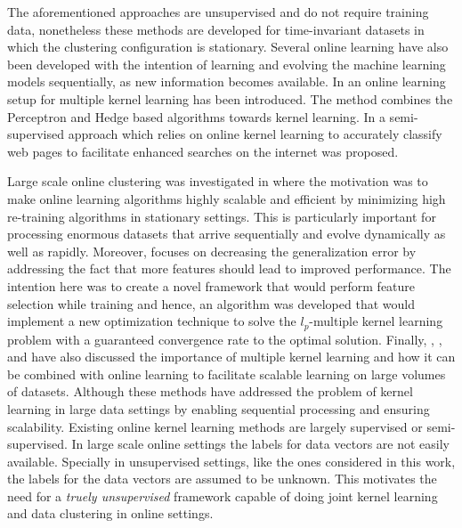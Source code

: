 \documentclass[10pt,final]{IEEEtran}
\begin{document}
The aforementioned approaches are unsupervised and do not require training data, nonetheless these methods are developed for time-invariant datasets in which the clustering configuration is stationary. 
Several online learning have also been developed
with the intention of learning and evolving the machine learning models  sequentially, as new information becomes available. In \cite{Online MKL,Online Multiple Kernel Learning} an online learning setup for multiple kernel learning has been introduced. The method combines the Perceptron and Hedge based algorithms  towards kernel learning. In \cite{Semi-supervised} a semi-supervised approach which relies on online kernel learning to accurately classify web pages to facilitate enhanced searches on the internet was proposed.

Large scale online clustering was investigated in \cite{LSOKL} where the motivation was to make online learning algorithms highly scalable and efficient by minimizing high re-training algorithms in stationary settings. This is particularly important for processing enormous datasets that arrive sequentially and evolve dynamically as well as rapidly. Moreover, \cite{MKL} focuses on decreasing the generalization error by addressing the fact that more features should lead to improved performance. The intention here was to create a novel framework that would perform feature selection while training and hence, an algorithm was developed that would implement a new optimization technique to solve the $l_p$-multiple kernel learning problem with a guaranteed convergence rate to the optimal solution. Finally, \cite{OEML}, \cite{OMKLGSF}, and \cite{Random OMKL} have also discussed the importance of multiple kernel learning and how it can be combined with online learning to facilitate scalable learning on large volumes of datasets. 
Although these methods have addressed the problem of kernel learning in large data settings by enabling sequential processing and ensuring scalability. Existing online kernel learning methods are largely supervised or semi-supervised. In large scale online settings the labels for data  vectors are not easily available. Specially in unsupervised settings, like the ones considered in this work, the labels for the data vectors are assumed to be unknown. This motivates the need for a \textit{truely unsupervised} framework capable of doing joint kernel learning and data clustering in online settings.   
\end{document}
